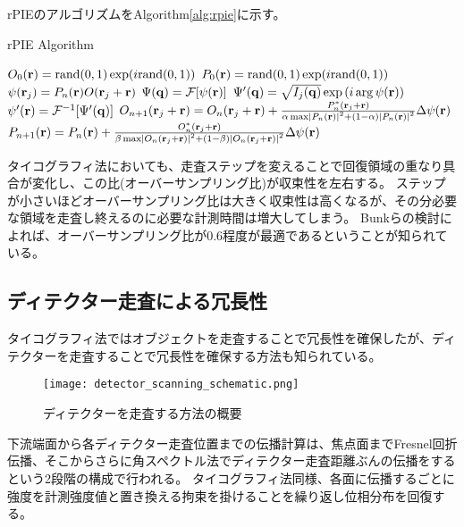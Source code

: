 rPIEのアルゴリズムをAlgorithm\ref{alg:rpie}に示す。

\begin{algorithm}[!ht]
\caption{rPIE Algorithm}         
\label{alg:rpie}                          
\begin{algorithmic}
    \STATE $O_0(\mathbf{r}) = \mathrm{rand}(0,1) \exp(i \mathrm{rand}(0,1) )$
    \STATE $P_0(\mathbf{r}) = \mathrm{rand}(0,1) \exp(i \mathrm{rand}(0,1) )$
        \STATE $\psi(\mathbf{r}_j) = P_n(\mathbf{r}) O(\mathbf{r}_j + \mathbf{r})$
        \STATE $\Psi(\mathbf{q}) = \mathcal F [\psi(\mathbf{r})]$
        \STATE $\Psi'(\mathbf{q}) = \sqrt{I_j(\mathbf{q})} \exp\left( i \arg \psi(\mathbf{r}) \right)$ 
        \STATE $\psi'(\mathbf{r}) = \mathcal F^{-1} [\Psi'(\mathbf{q})]$
        \STATE $O_{n+1}(\mathbf{r}_j + \mathbf{r}) 
          = O_n(\mathbf{r}_j + \mathbf{r}) + \frac{P_n^*(\mathbf{r}_j + \mathbf{r})}
          {\alpha \max \left| P_n(\mathbf{r}) \right|^2 + (1-\alpha) \left| P_n(\mathbf{r}) \right|^2}
          \Delta\psi(\mathbf{r})$
        \STATE $P_{n+1}(\mathbf{r})
          = P_n(\mathbf{r}) + \frac{O_n^*(\mathbf{r}_j + \mathbf{r})}
          {\beta \max \left| O_n(\mathbf{r}_j + \mathbf{r}) \right|^2 + (1-\beta) \left| O_n(\mathbf{r}_j + \mathbf{r}) \right|^2}
          \Delta\psi(\mathbf{r})$
      \ENDFOR
    \ENDFOR
\end{algorithmic}
\end{algorithm}

タイコグラフィ法においても、走査ステップを変えることで回復領域の重なり具合が変化し、この比(オーバーサンプリング比)が収束性を左右する。
ステップが小さいほどオーバーサンプリング比は大きく収束性は高くなるが、その分必要な領域を走査し終えるのに必要な計測時間は増大してしまう。
Bunkらの検討によれば、オーバーサンプリング比が0.6程度が最適であるということが知られている。\cite{Bunk2008}

\subsection{ディテクター走査による冗長性}
\label{chap3_detector_scanninc_introduction}

タイコグラフィ法ではオブジェクトを走査することで冗長性を確保したが、ディテクターを走査することで冗長性を確保する方法も知られている。

\begin{figure}[!ht]
\centering
\texttt{[image: detector\_scanning\_schematic.png]}
\caption{ディテクターを走査する方法の概要}
\label{fig:detector_scanning_schematic}
\end{figure}

下流端面から各ディテクター走査位置までの伝播計算は、焦点面までFresnel回折伝播、そこからさらに角スペクトル法でディテクター走査距離ぶんの伝播をするという2段階の構成で行われる。
タイコグラフィ法同様、各面に伝播するごとに強度を計測強度値と置き換える拘束を掛けることを繰り返し位相分布を回復する。


